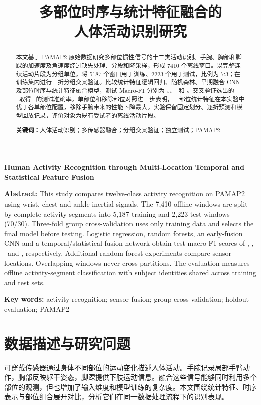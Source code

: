 \documentclass[UTF8,zihao=-4,a4paper,fontset=windows]{ctexart}
\title{多部位时序与统计特征融合的\\人体活动识别研究}
\date{}
\begin{document}
\maketitle
\begin{abstract}
本文基于 PAMAP2 原始数据研究多部位惯性信号的十二类活动识别。手腕、胸部和脚踝的加速度及角速度经过缺失处理、分段和降采样，形成 7410 个离线窗口。以完整连续活动片段为分组单位，将 5187 个窗口用于训练、2223 个用于测试，比例为 7:3；在训练集内进行三折分组交叉验证。比较统计特征逻辑回归、随机森林、早期融合 CNN 及部位时序与统计特征融合模型，测试 Macro-F1 分别为 \LRFone、\RFFone、\CNNFone\ 和 \FusionFone。交叉验证选出的 \BestName\ 取得 \BestAccuracy\ 的测试准确率。单部位和移除部位对照进一步表明，三部位统计特征在本实验中优于各单部位配置，移除手腕带来的性能下降最大。实验保留固定划分、逐折预测和模型回放记录，评价对象为既有受试者的离线活动片段。
\par\noindent\textbf{关键词：}人体活动识别；多传感器融合；分组交叉验证；独立测试；PAMAP2
\end{abstract}
\vspace{0.5em}
\begin{center}\bfseries Human Activity Recognition through Multi-Location Temporal and Statistical Feature Fusion\end{center}
\noindent\textbf{Abstract:} This study compares twelve-class activity recognition on PAMAP2 using wrist, chest and ankle inertial signals. The 7,410 offline windows are split by complete activity segments into 5,187 training and 2,223 test windows (70/30). Three-fold group cross-validation uses only training data and selects the final model before testing. Logistic regression, random forests, an early-fusion CNN and a temporal/statistical fusion network obtain test macro-F1 scores of \LRFone, \RFFone, \CNNFone\ and \FusionFone, respectively. Additional random-forest experiments compare sensor locations. Overlapping windows never cross partitions. The evaluation measures offline activity-segment classification with subject identities shared across training and test sets.
\par\noindent\textbf{Key words:} activity recognition; sensor fusion; group cross-validation; holdout evaluation; PAMAP2
\clearpage

\section{数据描述与研究问题}
可穿戴传感器通过身体不同部位的运动变化描述人体活动。手腕记录局部手臂动作，胸部反映躯干姿态，脚踝提供下肢运动信息。融合这些信号能够同时利用多个部位的观测，但也增加了输入维度和模型训练的复杂度。本文围绕统计特征、时序表示与部位组合展开对比，分析它们在同一数据处理流程下的识别表现。
\end{document}
